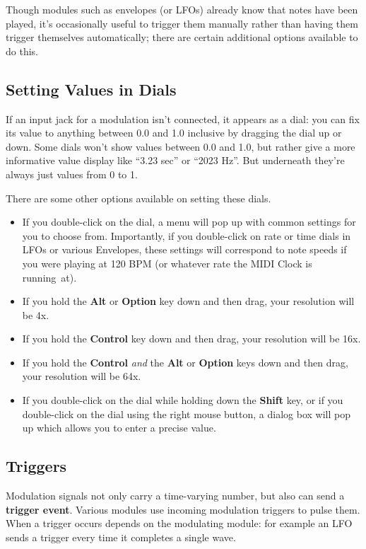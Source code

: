 \documentclass{article}
\begin{document}
Though modules such as envelopes (or LFOs) already know that notes have been played, it's occasionally useful to trigger them manually rather than having them trigger themselves automatically; there are certain additional options available to do this.

\subsection{Setting Values in Dials}

If an input jack for a modulation isn't connected, it appears as a dial: you can fix its value to anything between 0.0 and 1.0 inclusive by dragging the dial up or down.  Some dials won't show values between 0.0 and 1.0, but rather give a more informative value display like ``3.23 sec''  or ``2023 Hz''.  But underneath they're always just values from 0 to 1.

There are some other options available on setting these dials.  

\begin{itemize}
\item If you double-click on the dial, a menu will pop up with common settings for you to choose from.  Importantly, if you double-click on rate or time dials in LFOs or various Envelopes, these settings will correspond to note speeds if you were playing at 120 BPM (or whatever rate the MIDI Clock is running~at).
\item If you hold the {\bf Alt} or {\bf Option} key down and then drag, your resolution will be 4x.
\item If you hold the {\bf Control} key down and then drag, your resolution will be 16x.
\item If you hold the {\bf Control} {\it and} the {\bf Alt} or {\bf Option} keys down and then drag, your resolution will be 64x.
\item If you double-click on the dial while holding down the {\bf Shift} key, or if you double-click on the dial using the right mouse button, a dialog box will pop up which allows you to enter a precise value.
\end{itemize}

\subsection{Triggers}

Modulation signals not only carry a time-varying number, but also can send a {\bf trigger event}.  Various modules use incoming modulation triggers to pulse them.  When a trigger occurs depends on the modulating module: for example an LFO sends a trigger every time it completes a single wave. 
\end{document}
